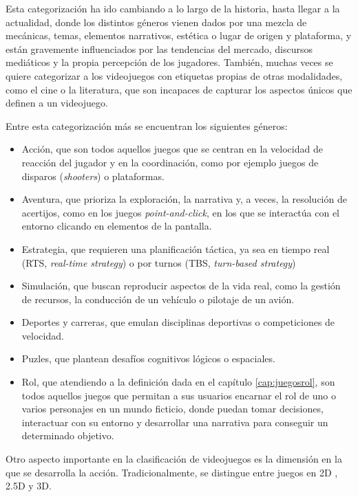\medskip

Esta categorización ha ido cambiando a lo largo de la historia, hasta llegar a la actualidad, donde los distintos géneros vienen dados por una mezcla de mecánicas, temas, elementos narrativos, estética o lugar de origen y plataforma, y están gravemente influenciados por las tendencias del mercado, discursos mediáticos y la propia percepción de los jugadores. También, muchas veces se quiere categorizar a los videojuegos con etiquetas propias de otras modalidades, como el cine o la literatura, que son incapaces de capturar los aspectos únicos que definen a un videojuego.

\smallskip

Entre esta categorización más  se encuentran los siguientes géneros:
\begin{itemize}
	\item Acción, que son todos aquellos juegos que se centran en la velocidad de reacción del jugador y en la coordinación, como por ejemplo juegos de disparos (\textit{shooters}) o plataformas.
	\item Aventura, que prioriza la exploración, la narrativa y, a veces, la resolución de acertijos, como en los juegos \textit{point-and-click}, en los que se interactúa con el entorno clicando en elementos de la pantalla.
	\item Estrategia, que requieren una planificación táctica, ya sea en tiempo real (RTS, \textit{real-time strategy}) o por turnos (TBS, \textit{turn-based strategy})
	\item Simulación, que buscan reproducir aspectos de la vida real, como la gestión de recursos, la conducción de un vehículo o pilotaje de un avión.
	\item Deportes y carreras, que emulan disciplinas deportivas o competiciones de velocidad.
	\item Puzles, que plantean desafíos cognitivos lógicos o espaciales.
	\item Rol, que atendiendo a la definición dada en el capítulo \ref{cap:juegosrol}, son todos aquellos juegos que permitan a sus usuarios encarnar el rol de uno o varios personajes en un mundo ficticio, donde puedan tomar decisiones, interactuar con su entorno y desarrollar una narrativa para conseguir un determinado objetivo.
\end{itemize}

\medskip

Otro aspecto importante en la clasificación de videojuegos es la dimensión en la que se desarrolla la acción. Tradicionalmente, se distingue entre juegos en 2D , 2.5D y 3D.

